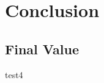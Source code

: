 \chapter{Conclusion}
\label{chapter:Conclusion}
\thispagestyle{myheadings} %

\section{Final Value}
\label{sec:FinalValue}

test4
